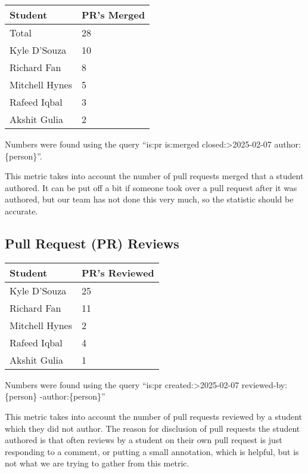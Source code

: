 \documentclass{article}
\begin{document}
\begin{table}[H]
  \centering
  \begin{tabular}{ll}
    \toprule
    \textbf{Student} & \textbf{PR's Merged}\\
    \midrule
    Total & 28\\
    Kyle D'Souza & 10\\
    Richard Fan & 8\\
    Mitchell Hynes & 5\\
    Rafeed Iqbal & 3\\
    Akshit Gulia & 2\\
    \bottomrule
  \end{tabular}
\end{table}

Numbers were found using the query ``is:pr is:merged
closed:\textgreater2025-02-07 author:\{person\}''.

This metric takes into account the number of pull requests merged
that a student authored. It can be put off a bit if someone took over
a pull request after it was authored, but our team has not done this
very much, so the statistic should be accurate.

\subsection{Pull Request (PR) Reviews}

\begin{table}[H]
  \centering
  \begin{tabular}{ll}
    \toprule
    \textbf{Student} & \textbf{PR's Reviewed}\\
    \midrule
    Kyle D'Souza & 25\\
    Richard Fan & 11\\
    Mitchell Hynes & 2\\
    Rafeed Iqbal & 4\\
    Akshit Gulia & 1\\
    \bottomrule
  \end{tabular}
\end{table}

Numbers were found using the query ``is:pr created:\textgreater2025-02-07
reviewed-by:\{person\} -author:\{person\}''

This metric takes into account the number of pull requests reviewed
by a student which they did not author. The reason for disclusion of
pull requests the student authored is that often reviews by a student
on their own pull request is just responding to a comment, or putting
a small annotation, which is helpful, but is not what we are trying
to gather from this metric.
\end{document}
